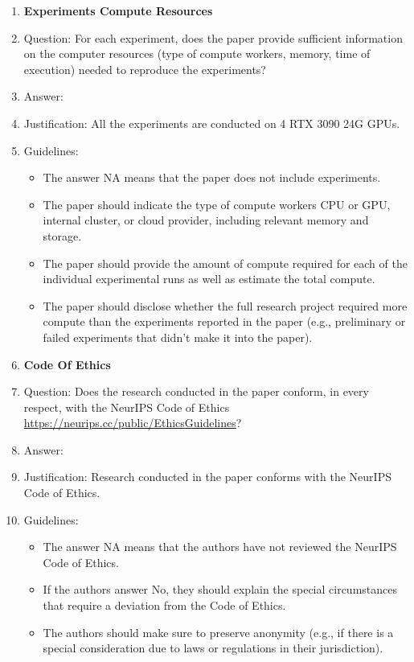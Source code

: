 \documentclass{article}
\begin{document}
\begin{enumerate}
\item {\bf Experiments Compute Resources}
    \item[] Question: For each experiment, does the paper provide sufficient information on the computer resources (type of compute workers, memory, time of execution) needed to reproduce the experiments?
    \item[] Answer: \answerYes{} %
    \item[] Justification: All the experiments are conducted on 4 RTX 3090 24G GPUs.
    \item[] Guidelines:
    \begin{itemize}
        \item The answer NA means that the paper does not include experiments.
        \item The paper should indicate the type of compute workers CPU or GPU, internal cluster, or cloud provider, including relevant memory and storage.
        \item The paper should provide the amount of compute required for each of the individual experimental runs as well as estimate the total compute. 
        \item The paper should disclose whether the full research project required more compute than the experiments reported in the paper (e.g., preliminary or failed experiments that didn't make it into the paper). 
    \end{itemize}
    
\item {\bf Code Of Ethics}
    \item[] Question: Does the research conducted in the paper conform, in every respect, with the NeurIPS Code of Ethics \url{https://neurips.cc/public/EthicsGuidelines}?
    \item[] Answer: \answerYes{} %
    \item[] Justification: Research conducted in the paper conforms with the NeurIPS Code of Ethics.
    \item[] Guidelines:
    \begin{itemize}
        \item The answer NA means that the authors have not reviewed the NeurIPS Code of Ethics.
        \item If the authors answer No, they should explain the special circumstances that require a deviation from the Code of Ethics.
        \item The authors should make sure to preserve anonymity (e.g., if there is a special consideration due to laws or regulations in their jurisdiction).
    \end{itemize}



\end{enumerate}
\end{document}
